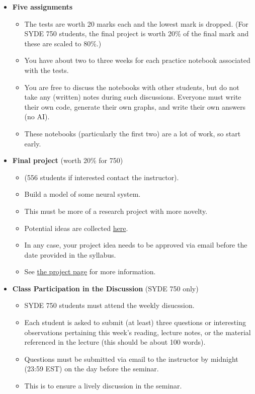 \documentclass[10pt,letterpaper,oneside]{article}
\begin{document}
\begin{itemize}
	\item \textbf{Five assignments} 
	\begin{itemize}
		\item The tests are worth 20 marks each and the lowest mark is dropped. (For SYDE 750 students, the final project is worth 20\% of the final mark and these are scaled to 80\%.)
		\item You have about two to three weeks for each practice notebook associated with the tests.
		\item You are free to discuss the notebooks with other students, but do not take any (written) notes during such discussions. Everyone must write their own code, generate their own graphs, and write their own answers (no AI).
		\item These notebooks (particularly the first two) are a lot of work, so start early.
	\end{itemize}
	\item \textbf{Final project} (worth 20\% for 750)
	\begin{itemize}
		\item (556 students if interested contact the instructor).
    \item Build a model of some neural system.
		\item This must be more of a research project with more novelty.
		\item Potential ideas are collected \href{http://compneuro.uwaterloo.ca/courses/syde-750/syde-556-possible-projects.html}{here}.
		\item In any case, your project idea needs to be approved via email before the date provided in the syllabus.
		\item See \href{http://compneuro.uwaterloo.ca/courses/syde-750/syde-556-possible-projects.html}{the project page} for more information.
	\end{itemize}
	\item \textbf{Class Participation in the Discussion}  (SYDE 750 only)
	\begin{itemize}
		\item SYDE 750 students must attend the weekly disucssion.
		\item Each student is asked to submit (at least) three questions or interesting observations pertaining this week's reading, lecture notes, or the material referenced in the lecture (this should be about 100 words).
		\item Questions must be submitted via email to the instructor by midnight (23:59 EST) on the day before the seminar.
		\item This is to ensure a lively discussion in the seminar.
	\end{itemize}
\end{itemize}
\end{document}
